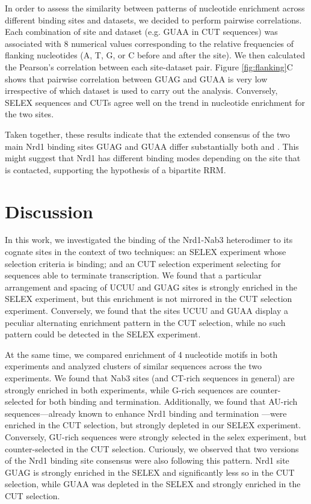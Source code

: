 In order to assess the similarity between patterns of nucleotide enrichment across different binding sites and datasets, we decided to perform pairwise correlations. Each combination of site and dataset (e.g. GUAA in CUT sequences) was associated with 8 numerical values corresponding to the relative frequencies of flanking nucleotides (A, T, G, or C before and after the site).  We then calculated the Pearson’s correlation between each site-dataset pair. Figure \ref{fig:flanking}C shows that pairwise correlation between GUAG and GUAA is very low irrespective of which dataset is used to carry out the analysis. Conversely, SELEX sequences and CUTs agree well on the trend in nucleotide enrichment for the two sites.

Taken together, these results indicate that the extended consensus of the two main Nrd1 binding sites GUAG and GUAA differ substantially both \invitro{} and \invivo{}. This might suggest that Nrd1 has different binding modes depending on the site that is contacted, supporting the hypothesis of a bipartite RRM.

\clearpage

\section{Discussion}

In this work, we investigated the binding of the Nrd1-Nab3 heterodimer to its cognate sites in the context of two techniques: an \invitro{} SELEX experiment whose selection criteria is binding; and an \invivo{} CUT selection experiment selecting for sequences able to terminate transcription. We found that a particular arrangement and spacing of UCUU and GUAG sites is strongly enriched in the SELEX experiment, but this enrichment is not mirrored in the CUT selection experiment. Conversely, we found that the sites UCUU and GUAA display a peculiar alternating enrichment pattern in the \invivo{} CUT selection, while no such pattern could be detected in the SELEX experiment.

At the same time, we compared enrichment of 4 nucleotide motifs in both experiments and analyzed clusters of similar sequences across the two experiments. We found that Nab3 sites (and CT-rich sequences in general) are strongly enriched in both experiments, while G-rich sequences are counter-selected for both \invitro{} binding and \invivo{} termination. Additionally, we found that AU-rich sequences---already known to enhance Nrd1 binding and termination \invivo{} \cite{porrua:2012:in}---were enriched in the CUT selection, but strongly depleted in our SELEX experiment. Conversely, GU-rich sequences were strongly selected in the selex experiment, but counter-selected in the \invivo{} CUT selection. Curiously, we observed that two versions of the Nrd1 binding site consensus were also following this pattern. Nrd1 site GUAG is strongly enriched in the SELEX and significantly less so in the CUT selection, while GUAA was depleted in the SELEX and strongly enriched in the CUT selection. 

